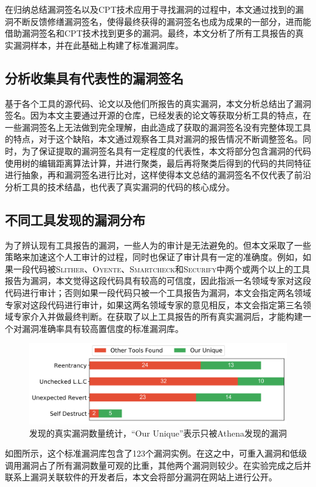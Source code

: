 在归纳总结漏洞签名以及CPT技术应用于寻找漏洞的过程中，本文通过找到的漏洞不断反馈修缮漏洞签名，使得最终获得的漏洞签名也成为成果的一部分，进而能借助漏洞签名和CPT技术找到更多的漏洞。最终，本文分析了所有工具报告的真实漏洞样本，并在此基础上构建了标准漏洞库。

\subsection{分析收集具有代表性的漏洞签名}

基于各个工具的源代码、论文以及他们所报告的真实漏洞，本文分析总结出了漏洞签名。因为本文主要通过开源的仓库，已经发表的论文等获取分析工具的特点，在一些漏洞签名上无法做到完全理解，由此造成了获取的漏洞签名没有完整体现工具的特点，对于这个缺陷，本文通过观察各工具对漏洞的报告情况不断调整签名。同时，为了保证提取的漏洞签名具有一定程度的代表性，本文将部分包含漏洞的代码使用树的编辑距离算法\cite{treeEditDistance}计算，并进行聚类，最后再将聚类后得到的代码的共同特征进行抽象，再和漏洞签名进行比对，这样使得本文总结的漏洞签名不仅代表了前沿分析工具的技术结晶，也代表了真实漏洞的代码的核心成分。

\subsection{不同工具发现的漏洞分布}

为了辨认现有工具报告的漏洞，一些人为的审计是无法避免的。但本文采取了一些策略来加速这个人工审计的过程，同时也保证了审计具有一定的准确度。例如，如果一段代码被\textsc{Slither}、\textsc{Oyente}、\textsc{Smartcheck}和\textsc{Securify}中两个或两个以上的工具报告为漏洞，本文觉得这段代码具有较高的可信度，因此指派一名领域专家对这段代码进行审计；否则如果一段代码只被一个工具报告为漏洞，本文会指定两名领域专家对这段代码进行审计，如果这两名领域专家的意见相反，本文会指定第三名领域专家介入并做最终判断。在获取了以上工具报告的所有真实漏洞后，才能构建一个对漏洞准确率具有较高置信度的标准漏洞库。
\begin{figure}
  \centering
  \includegraphics[width=\linewidth]{figures/unique_tp.png}
  \caption{发现的真实漏洞数量统计，“Our Unique”表示只被Athena发现的漏洞}\label{fig:unique_tp}
\end{figure}
如图所示，这个标准漏洞库包含了123个漏洞实例。在这之中，可重入漏洞和低级调用漏洞占了所有漏洞数量可观的比重，其他两个漏洞则较少。在实验完成之后并联系上漏洞关联软件的开发者后，本文会将部分漏洞在网站上进行公开。

